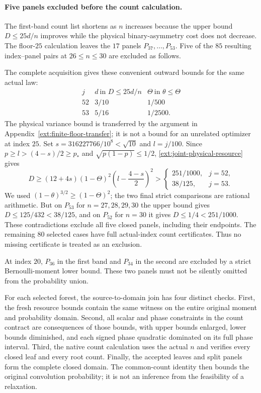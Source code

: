 \paragraph{Five panels excluded before the count calculation.}
The first-band count list shortens as $n$ increases because the upper
bound $D\le25d/n$ improves while the physical binary-asymmetry cost
does not decrease. The floor-$25$ calculation leaves the $17$ panels
$P_{37},\ldots,P_{53}$. Five of the $85$ resulting index--panel pairs
at $26\le n\le30$ are excluded as follows.

The complete acquisition gives these convenient outward bounds for the
same actual law:
\[
\begin{array}{c|c|c}
 j& d\ \text{in }D\le25d/n&\Theta\ \text{in }\theta\le\Theta\\\hline
 52&3/10&1/500\\
 53&5/16&1/2500.
\end{array}
\]
The physical variance bound is transferred by the argument in
Appendix~\ref{ext:finite-floor-transfer}; it is not a bound for an
unrelated optimizer at index $25$. Set $s=316227766/10^8<\sqrt{10}$
and $l=j/100$. Since $p\ge l>(4-s)/2\ge p_*$ and
$\sqrt{p(1-p)}\le1/2$, \eqref{ext:joint-physical-resource} gives
\[
 D\ge (12+4s)(1-\Theta)^2
            \left(l-\frac{4-s}{2}\right)^2
 >\begin{cases}251/1000,&j=52,\\38/125,&j=53.\end{cases}
\]
We used $(1-\theta)^{3/2}\ge(1-\Theta)^2$; the two final strict
comparisons are rational arithmetic. But on $P_{53}$ for
$n=27,28,29,30$ the upper bound gives
$D\le125/432<38/125$, and on $P_{52}$ for $n=30$ it gives
$D\le1/4<251/1000$. These contradictions exclude all five closed
panels, including their endpoints. The remaining $80$ selected cases
have full actual-index count certificates. Thus no missing certificate
is treated as an exclusion.

At index $20$, $P_{36}$ in the first band and $P_{34}$ in the second
are excluded by a strict Bernoulli-moment lower bound. These two
panels must not be silently omitted from the probability union.

For each selected forest, the source-to-domain join has four distinct
checks. First, the fresh resource bounds contain the same witness
on the entire original moment and probability domain. Second, all
scalar and phase constraints in the count contract are consequences
of those bounds, with upper bounds enlarged, lower bounds diminished,
and each signed phase quadratic dominated on its full phase interval.
Third, the native count calculation uses the actual $n$ and verifies
every closed leaf and every root count. Finally, the accepted leaves
and split panels form the complete closed domain. The common-count
identity then bounds the original convolution probability; it is not
an inference from the feasibility of a relaxation.

